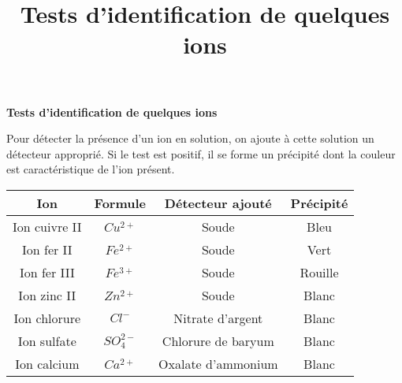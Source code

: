 \documentclass[a4paper, 14pt]{article}
\title{Tests d'identification de quelques ions}
\date{}
\begin{document}
	
\begin{center}
	\Huge{\textbf{Tests d'identification de quelques ions}}
\end{center}

{\LARGE 
Pour détecter la présence d'un ion en solution, on ajoute à cette solution un détecteur approprié. Si le test est positif, il se forme un précipité dont la couleur est caractéristique de l'ion présent.
}
\begin{huge}
	
\begin{center}
	
\begin{tabular}{|@{\ }c@{\ }|@{\ }c@{\ }|@{\ }c@{\ }|@{\ }c@{\ }|}
	\hline
	\textbf{Ion} & \textbf{Formule} & \textbf{Détecteur ajouté} & \textbf{Précipité} \\
	
	\hline
	Ion cuivre II & $Cu^{2+}$ & Soude & Bleu \\
	\hline
	Ion fer II & $Fe^{2+}$ & Soude & Vert \\
	\hline
	Ion fer III & $Fe^{3+}$ & Soude & Rouille \\
	\hline
	Ion zinc II & $Zn^{2+}$ & Soude & Blanc \\
	\hline
	Ion chlorure & $Cl^{-}$ & Nitrate d'argent & Blanc \\
	\hline
	Ion sulfate & $SO_{4}^{2-}$ & Chlorure de baryum & Blanc \\
	\hline
	Ion calcium & $Ca^{2+}$ & Oxalate d'ammonium & Blanc \\
	\hline
\end{tabular}
\end{center}
\end{huge}
\end{document}
